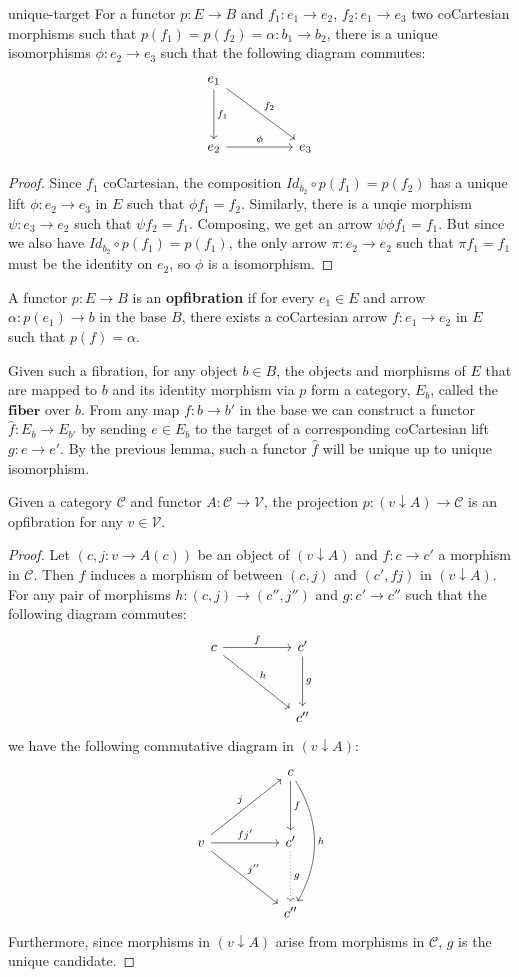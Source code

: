 \begin{lem}{unique-target}
For a functor $p : E \to B$ and $f_1 : e_1 \to e_2$, $f_2 : e_1 \to e_3$ two coCartesian morphisms such that $p(f_1) = p(f_2) = \alpha : b_1 \to b_2$, there is a unique isomorphisms $\phi : e_2 \to e_3$ such that the following diagram commutes:
\[
\ti
e_1 \ar[d, "f_1"] \ar[rd, "f_2"] & \\
e_2 \ar[r,"\phi"] &  e_3
\kz
\]
\begin{proof}
Since $f_1$ coCartesian, the composition $Id_{b_2} \circ p(f_1) = p(f_2)$ has a unique lift $\phi : e_2 \to e_3$ in $E$ such that $\phi f_1 = f_2$. Similarly, there is a unqie morphism $\psi : e_3 \to e_2$ such that $\psi f_2 = f_1$. Composing, we get an arrow $\psi \phi f_1 = f_1$. But since we also have $Id_{b_2} \circ p(f_1) = p(f_1)$, the only arrow $\pi : e_2 \to e_2$ such that $\pi f_1 = f_1$ must be the identity on $e_2$, so $\phi$ is a isomorphism.
\end{proof}
\end{lem}
\begin{defn}[Opfibration]
A functor $p : E \to B$ is an \textbf{opfibration} if for every $e_1 \in E$ and arrow $\alpha : p(e_1) \to b$ in the base $B$, there exists a coCartesian arrow $f : e_1 \to e_2$ in $E$ such that $p(f) = \alpha$.
\end{defn}
Given such a fibration, for any object $b \in B$, the objects and morphisms of $E$ that are mapped to $b$ and its identity morphism via $p$ form a category, $E_b$, called the $\textbf{fiber}$ over $b$. From any map $f : b \to b'$ in the base we can construct a functor $\hat f : E_b \to E_{b'}$ by sending $e \in E_b$ to the target of a corresponding coCartesian lift $g : e \to e'$. By the previous lemma, such a functor $\hat f$ will be unique up to unique isomorphism.
\begin{thm}
Given a category $\mathcal{C}$ and functor $A : \mathcal{C} \to \mathcal{V}$, the projection $p : (v \downarrow A) \to \mathcal{C}$ is an opfibration for any $v \in \mathcal{V}$.
\begin{proof}
Let $(c, j: v \to A(c))$ be an object of $(v \downarrow A)$ and $f: c \to c'$ a morphism in $\mathcal{C}$. Then $f$ induces a morphism of between $(c, j)$ and $(c', fj)$ in $(v \downarrow A)$. For any pair of morphisms $h : (c, j) \to (c'', j'')$ and $g : c' \to c''$ such that the following diagram commutes:
\[
\ti
c \ar[r, "f"] \ar[rd, "h"] & c' \ar[d, "g"]\\
& c''
\kz
\]
we have the following commutative diagram in $(v \downarrow A)$:
\[
\ti
& c \ar[d, "f"] \ar[dd, "h", bend left]\\
v \ar[ru, "j"] \ar[rd, "j''"] \ar[r, "f j'"]& c' \ar[d, dotted, "g"]\\
& c''
\kz
\]
Furthermore, since morphisms in $(v \downarrow A)$ arise from morphisms in $\mathcal{C}$, $g$ is the unique candidate.
\end{proof}
\end{thm}
